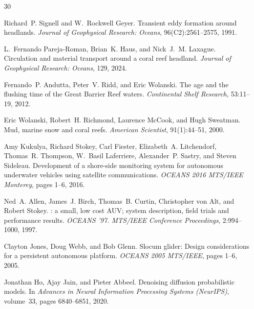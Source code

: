 \documentclass{article}
\begin{document}

\begin{thebibliography}{30}

Richard~P. Signell and W.~Rockwell Geyer.
\newblock Transient eddy formation around headlands.
\newblock \emph{Journal of Geophysical Research: Oceans}, 96(C2):2561--2575, 1991.

L.~Fernando Pareja-Roman, Brian~K. Haus, and Nick~J.~M. Laxague.
\newblock Circulation and material transport around a coral reef headland.
\newblock \emph{Journal of Geophysical Research: Oceans}, 129, 2024.

Fernando~P. Andutta, Peter~V. Ridd, and Eric Wolanski.
\newblock The age and the flushing time of the {G}reat {B}arrier {R}eef waters.
\newblock \emph{Continental Shelf Research}, 53:11--19, 2012.

Eric Wolanski, Robert~H. Richmond, Laurence McCook, and Hugh Sweatman.
\newblock Mud, marine snow and coral reefs.
\newblock \emph{American Scientist}, 91(1):44--51, 2000.

Amy Kukulya, Richard Stokey, Carl Fiester, Elizabeth~A. Litchendorf, Thomas~R. Thompson, W.~Basil Laferriere, Alexander~P. Sastry, and Steven Sideleau.
\newblock Development of a shore-side monitoring system for autonomous underwater vehicles using satellite communications.
\newblock \emph{OCEANS 2016 MTS/IEEE Monterey}, pages 1--6, 2016.

Ned~A. Allen, James~J. Birch, Thomas~B. Curtin, Christopher von Alt, and Robert Stokey.
: a small, low cost {AUV}; system description, field trials and performance results.
\newblock \emph{OCEANS '97. MTS/IEEE Conference Proceedings}, 2:994--1000, 1997.

Clayton Jones, Doug Webb, and Bob Glenn.
\newblock Slocum glider: Design considerations for a persistent autonomous platform.
\newblock \emph{OCEANS 2005 MTS/IEEE}, pages 1--6, 2005.

Jonathan Ho, Ajay Jain, and Pieter Abbeel.
\newblock Denoising diffusion probabilistic models.
\newblock In \emph{Advances in Neural Information Processing Systems (NeurIPS)}, volume~33, pages 6840--6851, 2020.


\end{thebibliography}
\end{document}
